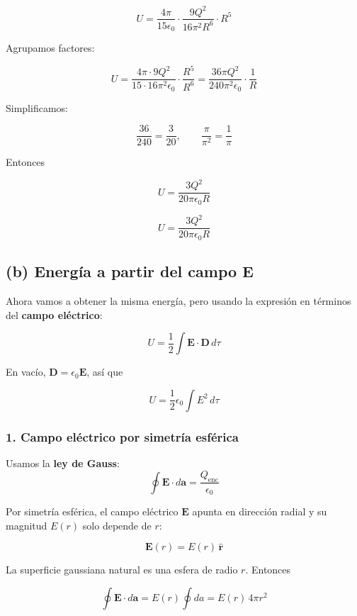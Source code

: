\documentclass{article}
\begin{document}
\[
U = \frac{4\pi}{15\epsilon_{0}}
     \cdot \frac{9Q^{2}}{16\pi^{2}R^{6}}
     \cdot R^{5}
\]

Agrupamos factores:

\[
U = \frac{4\pi\cdot 9Q^{2}}{15\cdot 16\pi^{2}\epsilon_{0}}
     \cdot \frac{R^{5}}{R^{6}}
= \frac{36\pi Q^{2}}{240\pi^{2}\epsilon_{0}}\cdot\frac{1}{R}
\]

Simplificamos:

\[
\frac{36}{240} = \frac{3}{20},
\qquad
\frac{\pi}{\pi^{2}} = \frac{1}{\pi}
\]

Entonces

\begin{equation}
U = \frac{3Q^{2}}{20\pi\epsilon_{0}R}
\label{eq:U-Q}
\end{equation}

\[
\boxed{U = \dfrac{3Q^{2}}{20\pi\epsilon_{0}R}}
\]

\subsection*{(b) Energía a partir del campo $\mathbf{E}$}

Ahora vamos a obtener la misma energía, pero usando la expresión en términos del \textbf{campo eléctrico}:

\[
U = \frac{1}{2}\int \mathbf{E}\cdot\mathbf{D}\,d\tau
\]

En vacío, $\mathbf{D} = \epsilon_{0}\mathbf{E}$, así que

\begin{equation}
U = \frac{1}{2}\epsilon_{0}\int E^{2}\,d\tau
\label{eq:U-campo-general}
\end{equation}

\subsubsection*{1. Campo eléctrico por simetría esférica}

Usamos la \textbf{ley de Gauss}:
\[
\oint \mathbf{E}\cdot d\mathbf{a} = \frac{Q_{\text{enc}}}{\epsilon_{0}}
\]

Por simetría esférica, el campo eléctrico $\mathbf{E}$ apunta en dirección radial y su magnitud $E(r)$ solo depende de $r$:

\[
\mathbf{E}(r) = E(r)\,\hat{\mathbf{r}}
\]

La superficie gaussiana natural es una esfera de radio $r$. Entonces

\[
\oint \mathbf{E}\cdot d\mathbf{a}
= E(r)\oint d a
= E(r)\,4\pi r^{2}
\]
\end{document}
